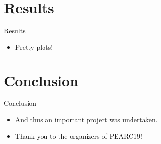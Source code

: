 \documentclass{beamer}
\begin{document}
\section{Results}
\begin{frame}{Results}
	\begin{itemize}
		\item Pretty plots!
	\end{itemize}
\end{frame}

\section{Conclusion}
\begin{frame}{Conclusion}
	\begin{itemize}
		\item And thus an important project was undertaken.
		\item Thank you to the organizers of PEARC19! 
	\end{itemize}
\end{frame}


%
%
\end{document}
